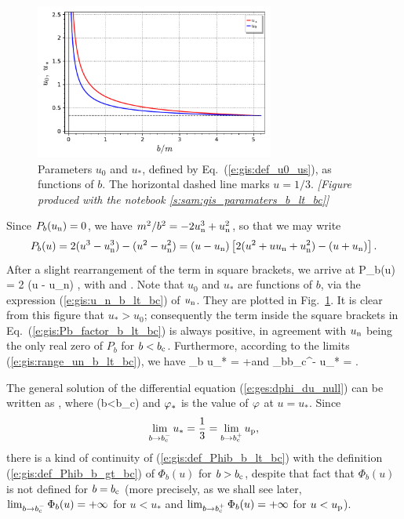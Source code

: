 \begin{figure}
\centerline{\includegraphics[width=0.7\textwidth]{gis_u0_us_b.pdf}}
\caption[]{\label{f:gis:u0_us_b} \footnotesize
Parameters $u_0$ and $u_*$, defined by Eq.~(\ref{e:gis:def_u0_us}), as functions
of $b$. The horizontal dashed line marks $u=1/3$.
\textsl{[Figure produced with the notebook \ref{s:sam:gis_paramaters_b_lt_bc}]}
}
\end{figure}


Since $P_b(u_{\rm n}) = 0$, we have $m^2/b^2 = - 2 u_{\rm n}^3 + u_{\rm n}^2$,
so that we may write
\[
    P_b(u) = 2 (u^3 - u_{\rm n}^3) - (u^2 - u_{\rm n}^2)
        = (u - u_{\rm n}) \left[ 2(u^2 + u u_{\rm n} + u_{\rm n}^2)
            - (u + u_{\rm n}) \right] .
\]
After a slight rearrangement of the term in square brackets, we arrive at
\be \label{e:gis:Pb_factor_b_lt_bc}
    P_b(u) = 2 (u - u_{\rm n}) \left[
        (u - u_0)^2 + (u_* - u_{\rm n})^2 - (u_0 - u_{\rm n})^2 \right] ,
\ee
with
\be \label{e:gis:def_u0_us}
    \qquad\mbox{and}\qquad
   .
\ee
Note that $u_0$ and $u_*$ are functions
of $b$, via the expression (\ref{e:gis:u_n_b_lt_bc}) of $u_{\rm n}$.
They are plotted in Fig.~\ref{f:gis:u0_us_b}. It is clear from this figure
that $u_* > u_0$; consequently the term inside the square brackets in
Eq.~(\ref{e:gis:Pb_factor_b_lt_bc}) is always positive, in agreement with
$u_{\rm n}$ being the only real
zero of $P_b$ for $b < b_{\rm c}$.
Furthermore, according to the limits (\ref{e:gis:range_un_b_lt_bc}), we have
\be \label{e:gis:lim_us}
    \lim_{b} u_* = +\infty \qquad\mbox{and}\qquad
    \lim_{b\to b_{\rm c}^-} u_* =  .
\ee

The general solution of the differential equation
(\ref{e:ges:dphi_du_null}) can be written as
\be \label{e:gis:ph_phs_Phib}
   ,
\ee
where
\be \label{e:gis:def_Phib_b_lt_bc}
     \quad (b<b_{\rm c})
\ee
and $\varphi_*$ is the value of $\varphi$ at $u=u_*$. Since
\[
    \lim_{b\to b_{\rm c}^-} u_* = \frac{1}{3} = \lim_{b\to b_{\rm c}^+} u_{\rm p},
\]
there is a kind of continuity of (\ref{e:gis:def_Phib_b_lt_bc})
with the definition (\ref{e:gis:def_Phib_b_gt_bc}) of $\Phi_b(u)$ for
$b>b_{\rm c}$, despite that fact that $\Phi_b(u)$ is not defined
for $b=b_{\rm c}$ (more precisely, as we shall see later,
$\lim_{b\to b_{\rm c}^-} \Phi_b(u) = + \infty$ for $u<u_*$ and
$\lim_{b\to b_{\rm c}^+} \Phi_b(u) = + \infty$ for $u<u_{\rm p}$).

